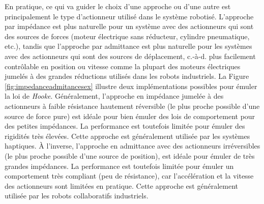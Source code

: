 En pratique, ce qui va guider le choix d'une approche ou d'une autre est principalement le type d'actionneur utilisé dans le système robotisé. L'approche par impédance est plus naturelle pour un système avec des actionneurs qui sont des sources de forces (moteur électrique sans réducteur, cylindre pneumatique, etc.), tandis que l'approche par admittance est plus naturelle pour les systèmes avec des actionneurs qui sont des sources de déplacement, c.-à-d. plus facilement contrôlable en position ou vitesse comme la plupart des moteurs électriques jumelés à des grandes réductions utilisés dans les robots industriels. La Figure \ref{fig:impedanceadmitancesex} illustre deux implémentations possibles pour émuler la loi de \textit{Hooke}.
%
Généralement, l'approche en impédance jumelée à des actionneurs à faible résistance hautement réversible (le plus proche possible d'une source de force pure) est idéale pour bien émuler des lois de comportement pour des petites impédances. La performance est toutefois limitée pour émuler des rigidités très élevées. Cette approche est généralement utilisée par les systèmes haptiques. À l'inverse, l'approche en admittance avec des actionneurs irréversibles (le plus proche possible d'une source de position), est idéale pour émuler de très grandes impédances. La performance est toutefois limitée pour émuler un comportement très compliant (peu de résistance), car l'accélération et la vitesse des actionneurs sont limitées en pratique. Cette approche est généralement utilisée par les robots collaboratifs industriels.
